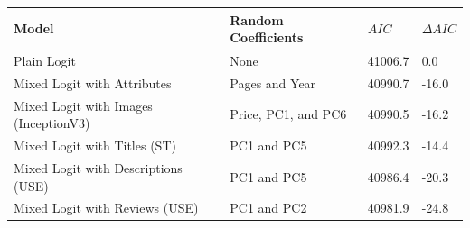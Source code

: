 \begin{centering}
\begin{tabular}{>{\raggedright}p{7.5cm}>{\raggedright}p{3.5cm}>{\centering}p{1.5cm}>{\centering}p{1.5cm}}
\hline
{\footnotesize\textbf{Model}} & {\footnotesize\textbf{Random Coefficients}} & {\footnotesize\textbf{$AIC$}} & {\footnotesize\textbf{$\Delta AIC$}}\tabularnewline
\hline
{\footnotesize Plain Logit} & {\footnotesize None} & {\footnotesize 41006.7} & {\footnotesize 0.0}\tabularnewline
{\footnotesize Mixed Logit with Attributes} & {\footnotesize Pages and Year} & {\footnotesize 40990.7} & {\footnotesize -16.0}\tabularnewline
{\footnotesize Mixed Logit with Images (InceptionV3)} & {\footnotesize Price, PC1, and PC6} & {\footnotesize 40990.5} & {\footnotesize -16.2}\tabularnewline
{\footnotesize Mixed Logit with Titles (ST)} & {\footnotesize PC1 and PC5} & {\footnotesize 40992.3} & {\footnotesize -14.4}\tabularnewline
{\footnotesize Mixed Logit with Descriptions (USE)} & {\footnotesize PC1 and PC5} & {\footnotesize 40986.4} & {\footnotesize -20.3}\tabularnewline
{\footnotesize Mixed Logit with Reviews (USE)} & {\footnotesize PC1 and PC2} & {\footnotesize 40981.9} & {\footnotesize -24.8}\tabularnewline
\hline
\end{tabular}
\par\end{centering}